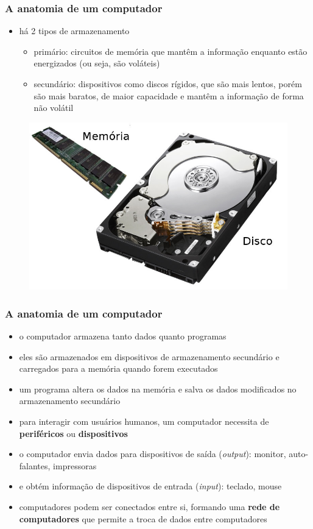 \documentclass[aspectratio=169]{beamer}
\begin{document}
\begin{frame}\frametitle{A anatomia de um computador}
\begin{itemize}
	\item há 2 tipos de armazenamento
	\begin{itemize}
		\item primário: circuitos de memória que mantêm a informação enquanto estão energizados (ou seja, são voláteis)
		\item secundário: dispositivos como discos rígidos, que são mais lentos, porém são mais baratos, de maior capacidade e mantêm a informação de forma não volátil
	\end{itemize}
\end{itemize}
\begin{figure}[h]
	\centering
	\includegraphics[height=0.45\paperheight]{pucrs-ep-fprog-unidade_01-introducao-laminas-armazenamento.jpg}
\end{figure}
\end{frame}

\begin{frame}\frametitle{A anatomia de um computador}
\begin{itemize}
	\item o computador armazena tanto dados quanto programas
	\item eles são armazenados em dispositivos de armazenamento secundário e carregados para a memória quando forem executados
	\item um programa altera os dados na memória e salva os dados modificados no armazenamento secundário
	\item para interagir com usuários humanos, um computador necessita de \textbf{periféricos} ou \textbf{dispositivos}
	\item o computador envia dados para dispositivos de saída (\emph{output}): monitor, auto-falantes, impressoras
	\item e obtém informação de dispositivos de entrada (\emph{input}): teclado, mouse
	\item computadores podem ser conectados entre si, formando uma \textbf{rede de computadores} que permite a troca de dados entre computadores
\end{itemize}
\end{frame}
\end{document}
